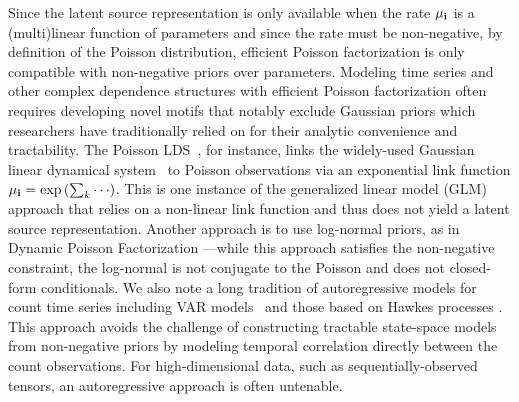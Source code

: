 \documentclass{article}
\begin{document}
Since the latent source representation is only available when the rate $\mu_{\textbf{\textrm{i}}}$ is a (multi)linear function of parameters and since the rate must be non-negative, by definition of the Poisson distribution, efficient Poisson factorization is only compatible with non-negative priors over parameters. Modeling time series and other complex dependence structures with efficient Poisson factorization often requires developing novel motifs that notably exclude Gaussian priors which researchers have traditionally relied on for their analytic convenience and tractability. The Poisson LDS~\cite{smith2003estimating, paninski2010new, macke2011empirical}, for instance, links the widely-used Gaussian linear dynamical system~\cite{kalman1961new,ghahramani1999learning} to  Poisson observations via an exponential link function $\mu_{\textbf{\textrm{i}}} = \exp\left({\sum_k \cdots}\right)$. This is one instance of the generalized linear model (GLM) \cite{nelder1972generalized} approach that relies on a non-linear link function and thus does not yield a latent source representation. Another approach is to use log-normal priors, as in Dynamic Poisson Factorization \cite{charlin2015dynamic}---while this approach satisfies the non-negative constraint, the log-normal is not conjugate to the Poisson and does not closed-form conditionals. We also note a long tradition of autoregressive models for count time series including VAR models~\cite{brandt2012bayesian} and those based on Hawkes processes \cite{hawkes1971spectra,blundell2012modelling,simma2012modeling,linderman2014discovering}. This approach avoids the challenge of constructing tractable state-space models from non-negative priors by modeling temporal correlation directly between the count observations. For high-dimensional data, such as sequentially-observed tensors, an autoregressive approach is often untenable. 



\end{document}

